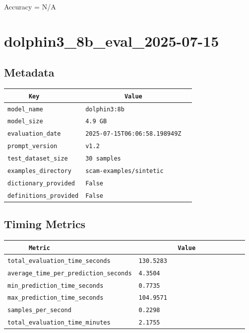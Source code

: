 \documentclass{article}
\begin{document}
\begin{center}
Accuracy = N/A
\end{center}

\section{dolphin3\_8b\_eval\_2025-07-15}
\subsection{Metadata}

\begin{center}
\begin{tabular}{l | l} \hline
    \verb|      Key      | & \verb|           Value           | \\ \hline
    \hline
    \verb|model_name    | & \verb|dolphin3:8b                  | \\ \hline
    \verb|model_size    | & \verb|4.9 GB                       | \\ \hline
    \verb|evaluation_date| & \verb|2025-07-15T06:06:58.198949Z  | \\ \hline
    \verb|prompt_version| & \verb|v1.2                         | \\ \hline
    \verb|test_dataset_size| & \verb|30 samples                   | \\ \hline
    \verb|examples_directory| & \verb|scam-examples/sintetic       | \\ \hline
    \verb|dictionary_provided| & \verb|False                        | \\ \hline
    \verb|definitions_provided| & \verb|False                        | \\ \hline
\end{tabular}
\end{center}

\subsection{Timing Metrics}

\begin{center}
\begin{tabular}{l | l} \hline
    \verb|      Metric     | & \verb|           Value           | \\ \hline
    \hline
    \verb|total_evaluation_time_seconds| & \verb|130.5283                     | \\ \hline
    \verb|average_time_per_prediction_seconds| & \verb|4.3504                       | \\ \hline
    \verb|min_prediction_time_seconds| & \verb|0.7735                       | \\ \hline
    \verb|max_prediction_time_seconds| & \verb|104.9571                     | \\ \hline
    \verb|samples_per_second| & \verb|0.2298                       | \\ \hline
    \verb|total_evaluation_time_minutes| & \verb|2.1755                       | \\ \hline
\end{tabular}
\end{center}
\end{document}
